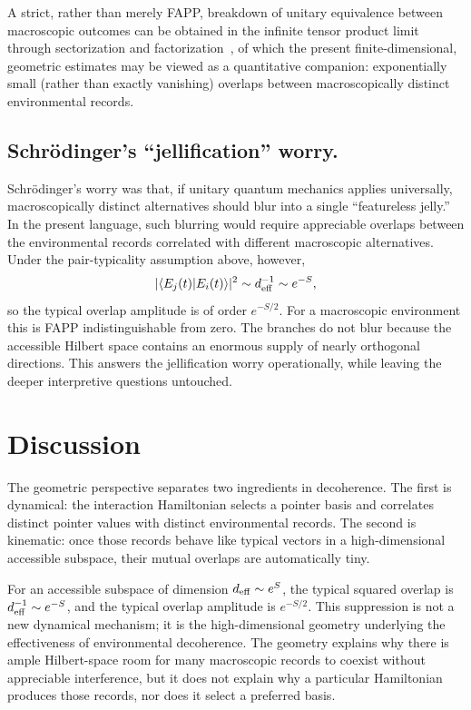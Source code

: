 \documentclass[aps,pra,reprint,superscriptaddress,nofootinbib,longbibliography]{revtex4-2}
\begin{document}
A strict, rather than merely FAPP, breakdown
of unitary equivalence between macroscopic outcomes can be obtained
in the infinite tensor product limit through sectorization and
factorization~\cite{vonNeumann1939,hepp-1972,van-den-bossche-2023-a,svozil-2025-u},
of which the present finite-dimensional, geometric estimates may be
viewed as a quantitative companion: exponentially small (rather than
exactly vanishing) overlaps between macroscopically distinct
environmental records.


\subsection*{Schr\"odinger's ``jellification'' worry.}
\label{sec:jelly}

Schr\"odinger's worry was that, if unitary quantum mechanics applies universally, macroscopically distinct alternatives should blur into a single ``featureless jelly.'' In the present language, such blurring would require appreciable overlaps between the environmental records correlated with different macroscopic alternatives. Under the pair-typicality assumption above, however,
\[
    |\langle E_j(t)|E_i(t)\rangle|^2
    \sim
    d_{\rm eff}^{-1}
    \sim
    e^{-S},
\]
so the typical overlap amplitude is of order $e^{-S/2}$. For a macroscopic environment this is FAPP indistinguishable from zero. The branches do not blur because the accessible Hilbert space contains an enormous supply of nearly orthogonal directions. This answers the jellification worry operationally, while leaving the deeper interpretive questions untouched.

\section{Discussion}

The geometric perspective separates two ingredients in decoherence. The first is dynamical: the interaction Hamiltonian selects a pointer basis and correlates distinct pointer values with distinct environmental records. The second is kinematic: once those records behave like typical vectors in a high-dimensional accessible subspace, their mutual overlaps are automatically tiny.

For an accessible subspace of dimension $d_{\rm eff}\sim e^S$, the typical squared overlap is $d_{\rm eff}^{-1}\sim e^{-S}$, and the typical overlap amplitude is $e^{-S/2}$. This suppression is not a new dynamical mechanism; it is the high-dimensional geometry underlying the effectiveness of environmental decoherence. The geometry explains why there is ample Hilbert-space room for many macroscopic records to coexist without appreciable interference, but it does not explain why a particular Hamiltonian produces those records, nor does it select a preferred basis.
\end{document}
